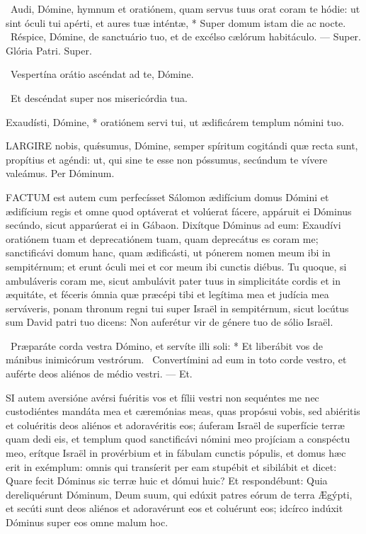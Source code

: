 \R\ Audi, Dómine, hymnum et oratiónem, quam servus tuus orat coram te hódie: ut sint óculi tui apérti, et aures tuæ inténtæ, * Super domum istam die ac nocte. \V\ Réspice, Dómine, de sanctuário tuo, et de excélso cælórum habitáculo. --- Super. Glória Patri. Super.


\V\ Vespertína orátio ascéndat ad te, Dómine.

\R\ Et descéndat super nos misericórdia tua.

 Exaudísti, Dómine, * oratiónem servi tui, ut ædificárem templum nómini tuo.


\lettrine[lines=2]{L}{ARGIRE} nobis, quǽsumus, Dómine, semper spíritum cogitándi quæ recta sunt, propítius et agéndi: ut, qui sine te esse non póssumus, secúndum te vívere valeámus. Per Dóminum.






\lettrine[lines=2]{F}{ACTUM} est autem cum perfecísset Sálomon ædifícium domus Dómini et ædifícium regis et omne quod optáverat et volúerat fácere, appáruit ei Dóminus secúndo, sicut apparúerat ei in Gábaon. Dixítque Dóminus ad eum: Exaudívi oratiónem tuam et deprecatiónem tuam, quam deprecátus es coram me; sanctificávi domum hanc, quam ædificásti, ut pónerem nomen meum ibi in sempitérnum; et erunt óculi mei et cor meum ibi cunctis diébus. Tu quoque, si ambuláveris coram me, sicut ambulávit pater tuus in simplicitáte cordis et in æquitáte, et féceris ómnia quæ præcépi tibi et legítima mea et judícia mea serváveris, ponam thronum regni tui super Israël in sempitérnum, sicut locútus sum David patri tuo dicens: Non auferétur vir de génere tuo de sólio Israël.

\R\ Præparáte corda vestra Dómino, et servíte illi soli: * Et liberábit vos de mánibus inimicórum vestrórum. \V\ Convertímini ad eum in toto corde vestro, et auférte deos aliénos de médio vestri. --- Et.


\lettrine[lines=2]{S}{I} autem aversióne avérsi fuéritis vos et fílii vestri non sequéntes me nec custodiéntes mandáta mea et cæremónias meas, quas propósui vobis, sed abiéritis et coluéritis deos aliénos et adoravéritis eos; áuferam Israël de superfície terræ quam dedi eis, et templum quod sanctificávi nómini meo projíciam a conspéctu meo, erítque Israël in provérbium et in fábulam cunctis pópulis, et domus hæc erit in exémplum: omnis qui transíerit per eam stupébit et sibilábit et dicet: Quare fecit Dóminus sic terræ huic et dómui huic? Et respondébunt: Quia dereliquérunt Dóminum, Deum suum, qui edúxit patres eórum de terra Ægýpti, et secúti sunt deos aliénos et adoravérunt eos et coluérunt eos; idcírco indúxit Dóminus super eos omne malum hoc.

